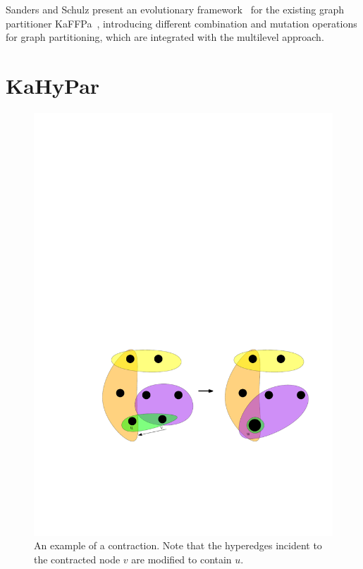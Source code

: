 \documentclass[a4paper,12pt,titlepage, BCOR7mm,headsepline]{scrbook}
\numberwithin{equation}{section}
\begin{document}

Sanders and Schulz present an evolutionary framework~\cite{sanders2012distributed} for the existing graph partitioner KaFFPa~\cite{holtgrewe2010engineering}, introducing different combination and mutation operations for graph partitioning, which are integrated with the multilevel approach.

\section{KaHyPar}
\begin{figure}[t!] 
    \vspace*{-.25cm}
  \centering
   \includegraphics[width=.8\textwidth]{Ipe/Coarsening_Example.pdf}
  \caption{An example of a contraction. Note that the hyperedges incident to the contracted node $v$ are modified to contain $u$.}\label{fig:coarsening_example}
    \vspace*{-.5cm}
\end{figure}
\end{document}
